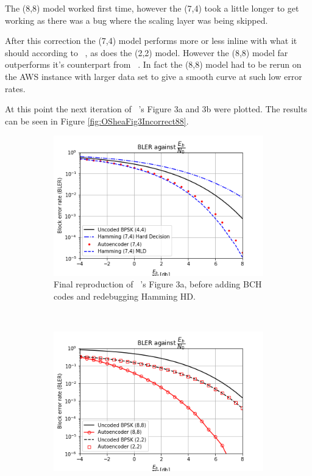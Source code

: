 \documentclass[12pt,onecolumn,letterpaper]{article}
\begin{document}
The (8,8) model worked first time, however the (7,4) took a little longer to get working as there was a bug where the scaling layer was being skipped.

After this correction the (7,4) model performs more or less inline with what it should according to ~\cite{oShea}, as does the (2,2) model. However the (8,8) model far outperforms it's counterpart from ~\cite{oShea}. In fact the (8,8) model had to be rerun on the AWS instance with larger data set to give a smooth curve at such low error rates. 

At this point the next iteration of ~\cite{oShea}'s Figure 3a and 3b were plotted. The results can be seen in Figure \ref{fig:OSheaFig3Incorrect88}.

\begin{figure}[t!]
   \centering
  \begin{subfigure}[t]{0.45\textwidth}
       \centering
       \includegraphics[width=\linewidth]{figures/o_shea_3a_bler_vs_eb.png}
       \caption{Final reproduction of ~\cite{oShea}'s Figure 3a, before adding BCH codes and redebugging Hamming HD.}
       \label{fig:OSheaFigure3aIncorrect88}
   \end{subfigure}
   ~
   \begin{subfigure}[t]{0.45\textwidth}
       \centering
       \includegraphics[width=\linewidth]{figures/o_shea_3b_bler_vs_eb_88_scaled_incorrectly.png}

\end{subfigure}
\end{figure}
\end{document}
